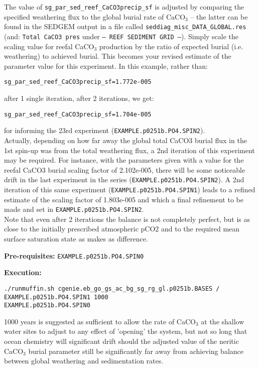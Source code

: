 \documentclass[10pt,twoside]{article}
\begin{document}
The value of \texttt{sg\_par\_sed\_reef\_CaCO3precip\_sf} is adjusted by comparing the specified weathering flux to the global burial rate of CaCO$_{3}$ -- the latter can be found in the SEDGEM output in a file called \texttt{seddiag\_misc\_DATA\_GLOBAL.res} (and: \texttt{Total CaCO3 pres} under \texttt{--- REEF SEDIMENT GRID ---}). Simply scale the scaling value for reefal CaCO$_{3}$  production by the ratio of expected burial (i.e. weathering) to achieved burial. This becomes your revised estimate of the parameter value for this experiment. In this example, rather than:
\vspace{-5pt}\begin{verbatim}
sg_par_sed_reef_CaCO3precip_sf=1.772e-005
                \end{verbatim}\vspace{-5pt}
after 1 single iteration, after 2 iterations, we get:
\vspace{-5pt}\begin{verbatim}
sg_par_sed_reef_CaCO3precip_sf=1.704e-005
                \end{verbatim}\vspace{-5pt}
for informing the 23rd experiment (\texttt{EXAMPLE.p0251b.PO4.SPIN2}).
\\ Actually, depending on how far away the global total CaCO3 burial flux in the 1st spin-up was from the total weathering flux, a 2nd iteration of this experiment may be required. For instance, with the parameters given with a value for the reefal CaCO3 burial scaling factor of 2.102e-005, there will be some noticeable drift in the last experiment in the series (\texttt{EXAMPLE.p0251b.PO4.SPIN2}). A 2nd iteration of this same experiment (\texttt{EXAMPLE.p0251b.PO4.SPIN1}) leads to a refined estimate of the scaling factor of 1.803e-005 and which a final refinement to be made and set in \texttt{EXAMPLE.p0251b.PO4.SPIN2}.
\\ Note that even after 2 iterations the balance is not completely perfect, but is as close to the initially prescribed atmospheric pCO2 and to the required mean surface saturation state as makes as difference. 

\noindent \textbf{Pre-requisites:} \texttt{EXAMPLE.p0251b.PO4.SPIN0}

\noindent \textbf{Execution:} 
\vspace{-10pt}\small\begin{verbatim}./runmuffin.sh cgenie.eb_go_gs_ac_bg_sg_rg_gl.p0251b.BASES / EXAMPLE.p0251b.PO4.SPIN1 1000 
EXAMPLE.p0251b.PO4.SPIN0\end{verbatim}\normalsize\vspace{-10pt}
1000 years is suggested as sufficient to allow the rate of CaCO$_{3}$ at the shallow water sites to adjust to any effect of 'opening' the system, but not so long that ocean chemistry will significant drift should the adjusted value of the neritic CaCO$_{3}$ burial parameter still be significantly far away from achieving balance between global weathering and sedimentation rates.
\end{document}
